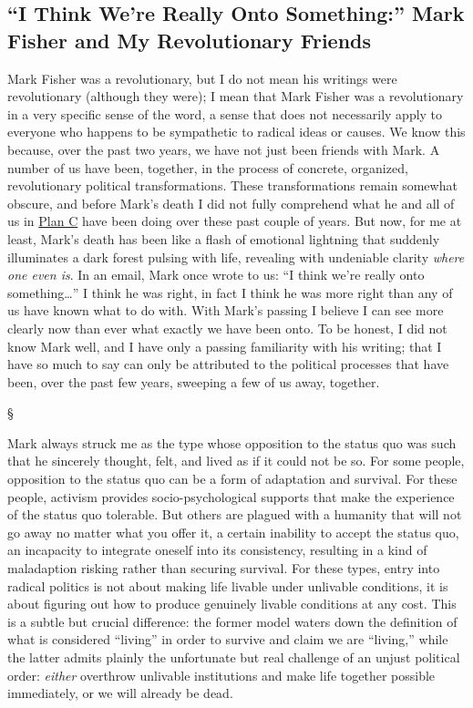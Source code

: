 \documentclass[a4paper,12pt,margin=.5in]{article}
\begin{document}
\subsection{\texorpdfstring{``I Think We're Really Onto Something:''
Mark Fisher and My Revolutionary
Friends}{I Think We're Really Onto Something: Mark Fisher and My Revolutionary Friends}}\label{i-think-were-really-onto-something-mark-fisher-and-my-revolutionary-friends}

Mark Fisher was a revolutionary, but I do not mean his writings were
revolutionary (although they were); I mean that Mark Fisher was a
revolutionary in a very specific sense of the word, a sense that does
not necessarily apply to everyone who happens to be sympathetic to
radical ideas or causes. We know this because, over the past two years,
we have not just been friends with Mark. A number of us have been,
together, in the process of concrete, organized, revolutionary political
transformations. These transformations remain somewhat obscure, and
before Mark's death I did not fully comprehend what he and all of us in
\href{http://www.weareplanc.org}{Plan C} have been doing over these past
couple of years. But now, for me at least, Mark's death has been like a
flash of emotional lightning that suddenly illuminates a dark forest
pulsing with life, revealing with undeniable clarity \emph{where one
even is}. In an email, Mark once wrote to us: ``I think we're really
onto something\ldots{}'' I think he was right, in fact I think he was
more right than any of us have known what to do with. With Mark's
passing I believe I can see more clearly now than ever what exactly we
have been onto. To be honest, I did not know Mark well, and I have only
a passing familiarity with his writing; that I have so much to say can
only be attributed to the political processes that have been, over the
past few years, sweeping a few of us away, together.

§

Mark always struck me as the type whose opposition to the status quo was
such that he sincerely thought, felt, and lived as if it could not be
so. For some people, opposition to the status quo can be a form of
adaptation and survival. For these people, activism provides
socio-psychological supports that make the experience of the status quo
tolerable. But others are plagued with a humanity that will not go away
no matter what you offer it, a certain inability to accept the status
quo, an incapacity to integrate oneself into its consistency, resulting
in a kind of maladaption risking rather than securing survival. For
these types, entry into radical politics is not about making life
livable under unlivable conditions, it is about figuring out how to
produce genuinely livable conditions at any cost. This is a subtle but
crucial difference: the former model waters down the definition of what
is considered ``living'' in order to survive and claim we are
``living,'' while the latter admits plainly the unfortunate but real
challenge of an unjust political order: \emph{either} overthrow
unlivable institutions and make life together possible immediately, or
we will already be dead.
\end{document}
